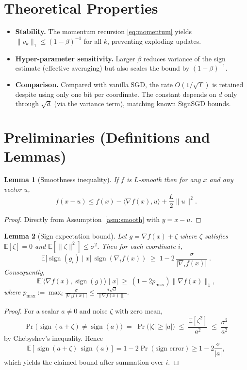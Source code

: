 \documentclass[11pt]{article}
\newtheorem{lemma}{Lemma}
\begin{document}
\section*{Theoretical Properties}
\begin{itemize}
    \item \textbf{Stability.} The momentum recursion \eqref{eq:momentum} yields
    $\|v_{k}\|_1\le (1-\beta)^{-1}$ for all $k$, preventing exploding updates.
    \item \textbf{Hyper‑parameter sensitivity.}
    Larger $\beta$ reduces variance of the sign estimate (effective averaging) but also scales the bound by $(1-\beta)^{-1}$.
    \item \textbf{Comparison.}
    Compared with vanilla SGD, the rate $O(1/\sqrt{T})$ is retained despite using only one bit per coordinate.
    The constant depends on $d$ only through $\sqrt{d}$ (via the variance term), matching known SignSGD bounds.
\end{itemize}

\section*{Preliminaries (Definitions and Lemmas)}
\begin{lemma}[Smoothness inequality]\label{lem:smooth}
If $f$ is $L$‑smooth then for any $x$ and any vector $u$,
\[
f(x-u)\le f(x)-\langle\nabla f(x),u\rangle+\frac{L}{2}\|u\|^2 .
\]
\end{lemma}
\begin{proof}
Directly from Assumption~\ref{asm:smooth} with $y=x-u$.
\end{proof}

\begin{lemma}[Sign expectation bound]\label{lem:sign}
Let $g=\nabla f(x)+\zeta$ where $\zeta$ satisfies $\mathbb{E}[\zeta]=0$ and
$\mathbb{E}[\|\zeta\|^2]\le\sigma^2$. Then for each coordinate $i$,
\[
\mathbb{E}\big[\operatorname{sign}(g_i)\mid x\big]\,
\operatorname{sign}(\nabla_i f(x))
\;\ge\;1-2\,\frac{\sigma}{|\nabla_i f(x)|}\; .
\]
Consequently,
\[
\mathbb{E}\big[\langle\nabla f(x),\operatorname{sign}(g)\rangle\mid x\big]
\;\ge\;(1-2p_{\max})\|\nabla f(x)\|_1,
\]
where $p_{\max}:=\max_i\frac{\sigma}{|\nabla_i f(x)|}\le \frac{\sigma\sqrt{d}}{\|\nabla f(x)\|_1}$.
\end{lemma}
\begin{proof}
For a scalar $a\neq0$ and noise $\zeta$ with zero mean,
\[
\Pr\big(\operatorname{sign}(a+\zeta)\neq\operatorname{sign}(a)\big)
\;=\;
\Pr\big(|\zeta|\ge |a|\big)
\;\le\;
\frac{\mathbb{E}[\zeta^2]}{a^2}
\;\le\;
\frac{\sigma^2}{a^2}
\]
by Chebyshev's inequality. Hence
\[
\mathbb{E}[\operatorname{sign}(a+\zeta)\,\operatorname{sign}(a)]
=1-2\Pr(\text{sign error})\ge 1-2\frac{\sigma}{|a|},
\]
which yields the claimed bound after summation over $i$.
\end{proof}
\end{document}
